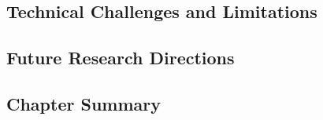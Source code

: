 \subsection{Technical Challenges and Limitations}

\subsection{Future Research Directions}

\subsection{Chapter Summary}

